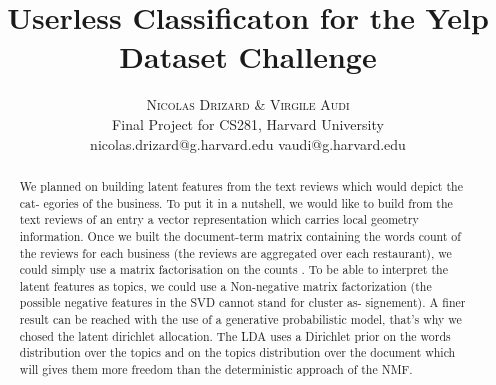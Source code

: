 \documentclass[twoside]{article}
\title{\vspace{-15mm}\fontsize{24pt}{10pt}\selectfont\textbf{Userless Classificaton for the Yelp Dataset Challenge}} %
\author{
\large
\textsc{Nicolas Drizard \& Virgile Audi}\\[2mm] %
\normalsize Final Project for CS281, Harvard University \\ %
\normalsize {nicolas.drizard@g.harvard.edu \quad vaudi@g.harvard.edu} %
\vspace{-5mm}
}
\date{}
\begin{document}
\maketitle %

\thispagestyle{fancy} %


\begin{abstract}

\noindent

We planned on building latent features from the text reviews which would depict the cat- egories of the business. To put it in a nutshell, we would like to build from the text reviews of an entry a vector representation which carries local geometry information. Once we built the document-term matrix containing the words count of the reviews for each business (the reviews are aggregated over each restaurant), we could simply use a matrix factorisation on the counts . To be able to interpret the latent features as topics, we could use a Non-negative matrix factorization (the possible negative features in the SVD cannot stand for cluster as- signement). A finer result can be reached with the use of a generative probabilistic model, that’s why we chosed the latent dirichlet allocation. The LDA uses a Dirichlet prior on the words distribution over the topics and on the topics distribution over the document which will gives them more freedom than the deterministic approach of the NMF.

\end{abstract}

\end{document}
